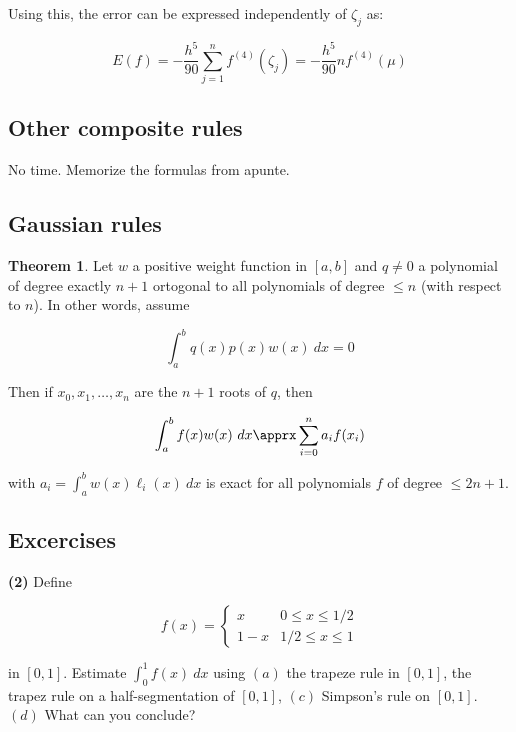 \documentclass[12pt]{article}
\theoremstyle{definition}
\newtheorem{theorem}{Theorem}
\begin{document}
Using this, the error can be expressed independently of $\zeta_j$ as:

\begin{equation*}
    E(f) = -\frac{h^5}{90} \sum_{j=1}^n f^{(4)}(\zeta_j) = -\frac{h^5}{90}
    nf^{(4)}(\mu)
\end{equation*}

\subsection{Other composite rules}

No time. Memorize the formulas from apunte.

\pagebreak 

\subsection{Gaussian rules}

\begin{theorem}
    Let $w$ a positive weight function in $[a, b]$ and $q \neq 0$ a polynomial 
    of degree exactly $n+1$ ortogonal to all polynomials of degree $\leq n$
    (with respect to $n$). In other words, assume 

    \begin{equation*}
        \int_a^b q(x) p(x) w(x) ~ dx = 0
    \end{equation*}

    Then if $x_0, x_1, \ldots, x_n$ are the $n+1$ roots of $q$, then 

    \begin{equation*}
        \int_a^b f(x) w(x) ~ dx \apprx \sum_{i=0}^n a_if(x_i)
    \end{equation*}

    with $a_i = \int_a^b w(x) \ell_i(x) ~ dx$ is exact for all polynomials $f$
    of degree $\leq 2n + 1$.
\end{theorem}

\pagebreak 

\subsection{Excercises}

\begin{shaded}
    \textbf{(2)} Define 

    \begin{equation*}
        f(x) = \begin{cases}
            x & 0 \leq x \leq 1 / 2 \\ 
            1 - x & 1 / 2 \leq x \leq 1
        \end{cases}
    \end{equation*}

    in $[0, 1]$. Estimate $\int_0^1 f(x) ~ dx$ using $(a)$ the trapeze rule in
    $[0, 1]$, the trapez rule on a half-segmentation of $[0, 1]$, $(c)$
    Simpson's rule on $[0, 1]$. $(d)$ What can you conclude?
\end{shaded}
\end{document}
